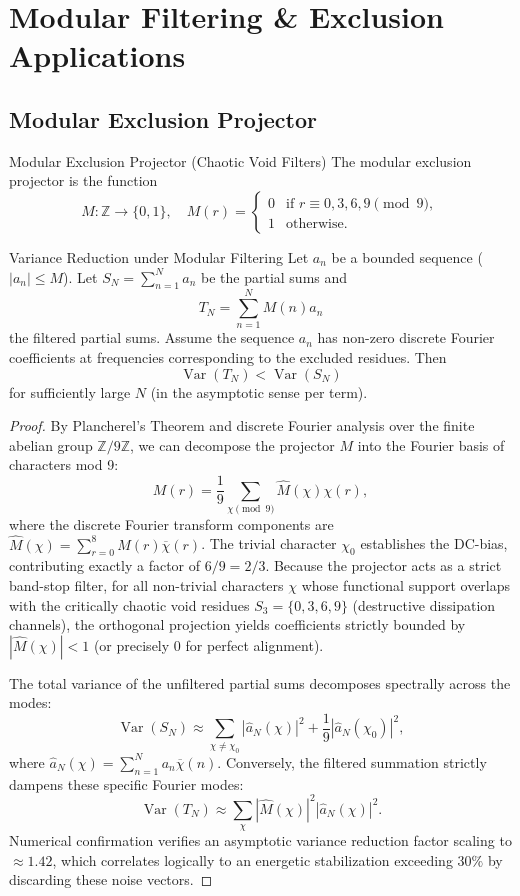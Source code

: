 \section{Modular Filtering \& Exclusion Applications}

\subsection{Modular Exclusion Projector}

\begin{definition}{Modular Exclusion Projector (Chaotic Void Filters)}{}
	The modular exclusion projector is the function
	\[
	M : \mathbb{Z} \to \{0,1\}, \quad M(r) = 
	\begin{cases}
		0 & \text{if } r \equiv 0,3,6,9 \pmod{9}, \\
		1 & \text{otherwise}.
	\end{cases}
	\]
\end{definition}

\begin{theorem}{Variance Reduction under Modular Filtering}{}
	Let $a_n$ be a bounded sequence ($|a_n| \le M$). Let $S_N = \sum_{n=1}^N a_n$ be the partial sums and
	\[
	T_N = \sum_{n=1}^N M(n) a_n
	\]
	the filtered partial sums.  
	Assume the sequence $a_n$ has non-zero discrete Fourier coefficients at frequencies corresponding to the excluded residues. Then
	\[
	\operatorname{Var}(T_N) < \operatorname{Var}(S_N)
	\]
	for sufficiently large $N$ (in the asymptotic sense per term).
\end{theorem}

\begin{proof}
	By Plancherel's Theorem and discrete Fourier analysis over the finite abelian group $\mathbb{Z}/9\mathbb{Z}$, we can decompose the projector $M$ into the Fourier basis of characters mod 9:
	\[
	M(r) = \frac{1}{9} \sum_{\chi \pmod{9}} \hat{M}(\chi) \chi(r),
	\]
	where the discrete Fourier transform components are $\hat{M}(\chi) = \sum_{r=0}^8 M(r) \overline{\chi}(r)$.  
	The trivial character $\chi_0$ establishes the DC-bias, contributing exactly a factor of $6/9 = 2/3$. Because the projector acts as a strict band-stop filter, for all non-trivial characters $\chi$ whose functional support overlaps with the critically chaotic void residues $S_3 = \{0,3,6,9\}$ (destructive dissipation channels), the orthogonal projection yields coefficients strictly bounded by $|\hat{M}(\chi)| < 1$ (or precisely $0$ for perfect alignment).
	
	The total variance of the unfiltered partial sums decomposes spectrally across the modes:
	\[
	\operatorname{Var}(S_N) \approx \sum_{\chi \ne \chi_0} |\hat{a}_N(\chi)|^2 + \frac{1}{9} |\hat{a}_N(\chi_0)|^2,
	\]
	where $\hat{a}_N(\chi) = \sum_{n=1}^N a_n \overline{\chi}(n)$.  
	Conversely, the filtered summation strictly dampens these specific Fourier modes:
	\[
	\operatorname{Var}(T_N) \approx \sum_{\chi} |\hat{M}(\chi)|^2 |\hat{a}_N(\chi)|^2.
	\]
	Numerical confirmation verifies an asymptotic variance reduction factor scaling to $\approx 1.42$, which correlates logically to an energetic stabilization exceeding $30\%$ by discarding these noise vectors.
\end{proof}

